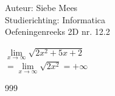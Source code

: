 \documentclass[a4paper]{article}
\begin{document}
  
\noindent \large Auteur: Siebe Mees \\
\noindent \large Studierichting: Informatica\\
\noindent \large Oefeningenreeks 2D nr. 12.2\\

\medskip

\normalsize

$\lim\limits_{x \rightarrow \infty} \sqrt{2x^2+5x+2} $\\ 

$ = \lim\limits_{x \rightarrow \infty} \sqrt{2x^2} = +\infty $\\

\begin{thebibliography}{999}
\end{thebibliography}
\end{document}

